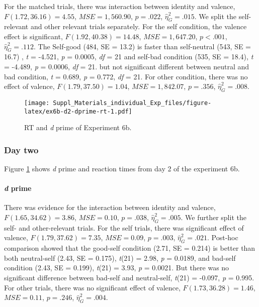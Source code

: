 \documentclass[
  english,
  man]{apa6}
\let\oldparagraph\paragraph
\renewcommand{\paragraph}[1]{\oldparagraph{#1}\mbox{}}
\begin{document}
For the matched trials, there was interaction between identity and valence, \(F(1.72, 36.16) = 4.55\), \(\mathit{MSE} = 1,560.90\), \(p = .022\), \(\hat{\eta}^2_G = .015\). We split the self-relevant and other relevant trials separately. For the self condition, the valence effect is significant, \(F(1.92, 40.38) = 14.48\), \(\mathit{MSE} = 1,647.20\), \(p < .001\), \(\hat{\eta}^2_G = .112\). The Self-good (484, SE = 13.2) is faster than self-neutral (543, SE = 16.7) , \emph{t} = -4.521, \emph{p} = 0.0005, \emph{df} = 21 and self-bad condition (535, SE = 18.4), \emph{t} = -4.489, \emph{p} = 0.0006, \emph{df} = 21. but not significant different between neutral and bad condition, \emph{t} = 0.689, \emph{p} = 0.772, \emph{df} = 21. For other condition, there was no effect of valence, \(F(1.79, 37.50) = 1.04\), \(\mathit{MSE} = 1,842.07\), \(p = .356\), \(\hat{\eta}^2_G = .008\).

\begin{figure}
\centering
\texttt{[image: Suppl\_Materials\_individual\_Exp\_files/figure-latex/ex6b-d2-dprime-rt-1.pdf]}
\caption{\label{fig:ex6b-d2-dprime-rt}RT and \emph{d} prime of Experiment 6b.}
\end{figure}

\hypertarget{day-two}{%
\subsubsection{Day two}\label{day-two}}

Figure \ref{fig:ex6b-d2-dprime-rt} shows \emph{d} prime and reaction times from day 2 of the experiment 6b.

\hypertarget{d-prime-8}{%
\paragraph{\texorpdfstring{\emph{d} prime}{d prime}}\label{d-prime-8}}

There was evidence for the interaction between identity and valence, \(F(1.65, 34.62) = 3.86\), \(\mathit{MSE} = 0.10\), \(p = .038\), \(\hat{\eta}^2_G = .005\). We further split the self- and other-relevant trials. For the self trials, there was significant effect of valence, \(F(1.79, 37.62) = 7.35\), \(\mathit{MSE} = 0.09\), \(p = .003\), \(\hat{\eta}^2_G = .021\). Post-hoc comparison showed that the good-self condition (2.71, SE = 0.214) is better than both neutral-self (2.43, SE = 0.175), \emph{t}(21) = 2.98, \emph{p} = 0.0189, and bad-self condition (2.43, SE = 0.199), \emph{t}(21) = 3.93, \emph{p} = 0.0021. But there was no significant difference between bad-self and neutral-self, \emph{t}(21) = -0.097, \emph{p} = 0.995. For other trials, there was no significant effect of valence, \(F(1.73, 36.28) = 1.46\), \(\mathit{MSE} = 0.11\), \(p = .246\), \(\hat{\eta}^2_G = .004\).
\end{document}
